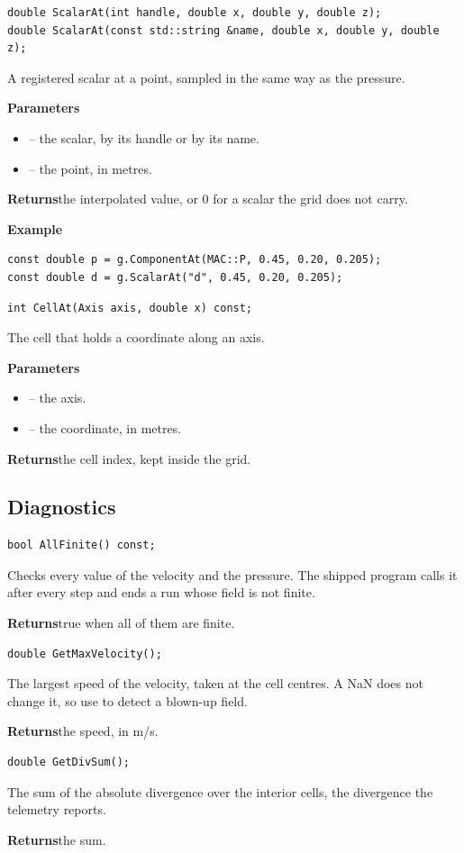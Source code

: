 \documentclass[10pt,a4paper]{article}
\newcommand{\code}[1]{\texttt{\detokenize{#1}}}
\newenvironment{params}{\par\noindent\textbf{Parameters}\begin{itemize}[leftmargin=1.4em,itemsep=0pt,topsep=1pt,parsep=0pt]}{\end{itemize}}
\newcommand{\p}[2]{\item \code{#1} -- #2}
\newcommand{\returns}[1]{\par\noindent\textbf{Returns}\quad #1\par}
\newcommand{\example}{\par\smallskip\noindent\textbf{Example}\par}
\begin{document}
\begin{lstlisting}[style=sig]
double ScalarAt(int handle, double x, double y, double z);
double ScalarAt(const std::string &name, double x, double y, double z);
\end{lstlisting}
A registered scalar at a point, sampled in the same way as the pressure.
\begin{params}
\p{handle, name}{the scalar, by its handle or by its name.}
\p{x, y, z}{the point, in metres.}
\end{params}
\returns{the interpolated value, or 0 for a scalar the grid does not carry.}
\example
\begin{lstlisting}[style=ex]
const double p = g.ComponentAt(MAC::P, 0.45, 0.20, 0.205);
const double d = g.ScalarAt("d", 0.45, 0.20, 0.205);
\end{lstlisting}

\begin{lstlisting}[style=sig]
int CellAt(Axis axis, double x) const;
\end{lstlisting}
The cell that holds a coordinate along an axis.
\begin{params}
\p{axis}{the axis.}
\p{x}{the coordinate, in metres.}
\end{params}
\returns{the cell index, kept inside the grid.}

\subsection{Diagnostics}

\begin{lstlisting}[style=sig]
bool AllFinite() const;
\end{lstlisting}
Checks every value of the velocity and the pressure. The shipped program calls it after every step and ends a run
whose field is not finite.
\returns{true when all of them are finite.}

\begin{lstlisting}[style=sig]
double GetMaxVelocity();
\end{lstlisting}
The largest speed of the velocity, taken at the cell centres. A NaN does not change it, so use \code{AllFinite} to
detect a blown-up field.
\returns{the speed, in m/s.}

\begin{lstlisting}[style=sig]
double GetDivSum();
\end{lstlisting}
The sum of the absolute divergence over the interior cells, the divergence the telemetry reports.
\returns{the sum.}
\end{document}
